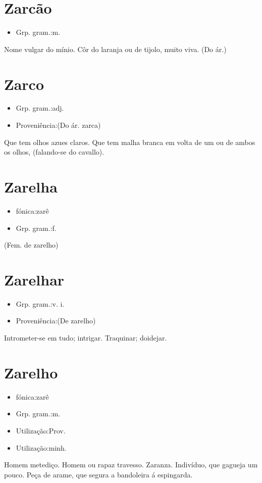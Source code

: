 \section{Zarcão}
\begin{itemize}
\item {Grp. gram.:m.}
\end{itemize}
Nome vulgar do mínio.
Côr do laranja ou de tijolo, muito viva.
(Do ár.)
\section{Zarco}
\begin{itemize}
\item {Grp. gram.:adj.}
\end{itemize}
\begin{itemize}
\item {Proveniência:(Do ár. \textunderscore zarca\textunderscore )}
\end{itemize}
Que tem olhos azues claros.
Que tem malha branca em volta de um ou de ambos os olhos, (falando-se do cavallo).
\section{Zarelha}
\begin{itemize}
\item {fónica:zarê}
\end{itemize}
\begin{itemize}
\item {Grp. gram.:f.}
\end{itemize}
(Fem. de \textunderscore zarelho\textunderscore )
\section{Zarelhar}
\begin{itemize}
\item {Grp. gram.:v. i.}
\end{itemize}
\begin{itemize}
\item {Proveniência:(De \textunderscore zarelho\textunderscore )}
\end{itemize}
Intrometer-se em tudo; intrigar.
Traquinar; doidejar.
\section{Zarelho}
\begin{itemize}
\item {fónica:zarê}
\end{itemize}
\begin{itemize}
\item {Grp. gram.:m.}
\end{itemize}
\begin{itemize}
\item {Utilização:Prov.}
\end{itemize}
\begin{itemize}
\item {Utilização:minh.}
\end{itemize}
Homem metediço.
Homem ou rapaz travesso.
Zaranza.
Indivíduo, que gagueja um pouco.
Peça de arame, que segura a bandoleira á espingarda.
